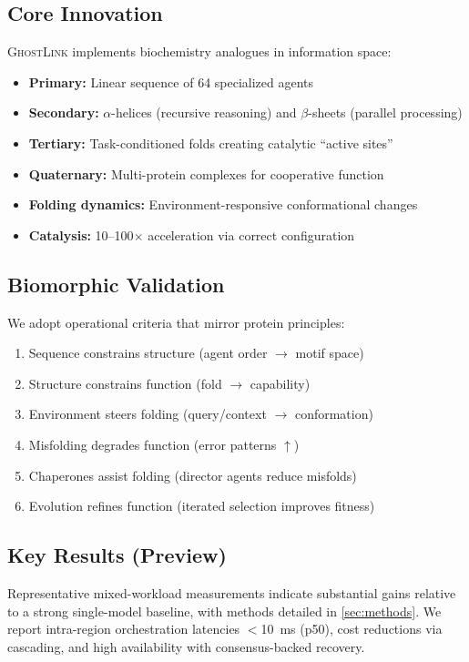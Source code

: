 \documentclass[11pt]{article}
\newcommand{\gl}{\textsc{GhostLink}}
\begin{document}
\subsection{Core Innovation}
\gl{} implements biochemistry analogues in information space:
\begin{itemize}[leftmargin=1.2em]
\item \textbf{Primary:} Linear sequence of 64 specialized agents
\item \textbf{Secondary:} $\alpha$-helices (recursive reasoning) and $\beta$-sheets (parallel processing)
\item \textbf{Tertiary:} Task-conditioned folds creating catalytic ``active sites''
\item \textbf{Quaternary:} Multi-protein complexes for cooperative function
\item \textbf{Folding dynamics:} Environment-responsive conformational changes
\item \textbf{Catalysis:} 10--100$\times$ acceleration via correct configuration
\end{itemize}
\subsection{Biomorphic Validation}
We adopt operational criteria that mirror protein principles:
\begin{enumerate}[leftmargin=1.2em]
\item Sequence constrains structure (agent order $\to$ motif space)
\item Structure constrains function (fold $\to$ capability)
\item Environment steers folding (query/context $\to$ conformation)
\item Misfolding degrades function (error patterns $\uparrow$)
\item Chaperones assist folding (director agents reduce misfolds)
\item Evolution refines function (iterated selection improves fitness)
\end{enumerate}
\subsection{Key Results (Preview)}
Representative mixed-workload measurements indicate substantial gains relative to a strong single-model baseline, with methods detailed in \cref{sec:methods}. We report intra-region orchestration latencies $<$\SI{10}{\milli\second} (p50), cost reductions via cascading, and high availability with consensus-backed recovery.
\end{document}
